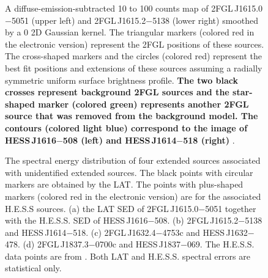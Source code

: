 \documentclass[12pt,preprint]{aastex}
\newif\ifcolorfigure
\newcommand{\gev}{\text{GeV}\xspace}
\newcommand{\tev}{\text{TeV}\xspace}
\newcommand{\newtext}[1]{{\bfseries \color{red}#1}}
\begin{document}
\begin{figure}
    \ifcolorfigure
      \plotone{source_plots/source_HESS_J1614-518_color.eps}
    \else
    \fi
  \caption{
    A diffuse-emission-subtracted 10 \gev to 100 \gev counts
    map of 2FGL\,J1615.0$-$5051 (upper left)
    and 2FGL\,J1615.2$-$5138 (lower right) smoothed by a 0
    2D Gaussian kernel.  The triangular markers (colored red in the
    electronic version) represent the 2FGL positions of these sources.
    The cross-shaped markers and the
    circles (colored red) represent the best fit
    positions and extensions of these sources assuming a radially
    symmetric uniform surface brightness profile.  
    \newtext{The two black crosses represent  background 2FGL sources and
    the star-shaped
    marker (colored green) represents another 2FGL source that was removed from the background
    model.  The contours (colored light blue) correspond to the \tev
    image of HESS\,J1616$-$508 (left) and HESS\,J1614$-$518 (right)
    }
    \citep{hess_plane_survey}.   
    }\label{1FGL_J1613.6-5100c}
\end{figure}


\clearpage
\begin{figure}
    \ifcolorfigure
      \plotone{summary_plots/hess_seds_color.eps}
    \else
    \fi
    \caption{
    The spectral energy distribution of four extended
    sources associated with unidentified
    extended \tev sources.  The black points
    with circular markers are obtained by the LAT. The points with
    plus-shaped markers (colored red in the electronic version) are
    for the associated H.E.S.S sources.  (a) the
    LAT SED of 2FGL\,J1615.0$-$5051 together with the H.E.S.S. SED
    of HESS\,J1616$-$508. (b) 2FGL\,J1615.2$-$5138
    and HESS\,J1614$-$518. (c) 2FGL\,J1632.4$-$4753c
    and HESS\,J1632$-$478. (d) 2FGL\,J1837.3$-$0700c
    and HESS\,J1837$-$069. The H.E.S.S. data points are from
    \citep{hess_plane_survey}. Both LAT and H.E.S.S. spectral errors are
    statistical only.}
    \label{hess_seds}
  \end{figure}
\end{document}
